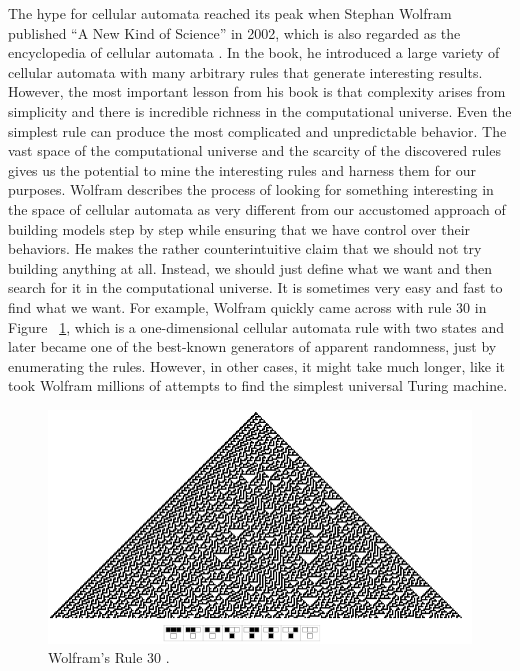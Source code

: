 \documentclass[12pt]{article}
\numberwithin{figure}{section} %
\begin{document}
The hype for cellular automata reached its peak when Stephan Wolfram published “A New Kind of Science” in 2002, which is also regarded as the encyclopedia of cellular automata \cite{A new kind of Science}. In the book, he introduced a large variety of cellular automata with many arbitrary rules that generate interesting results. However, the most important lesson from his book is that complexity arises from simplicity and there is incredible richness in the computational universe. Even the simplest rule can produce the most complicated and unpredictable behavior. The vast space of the computational universe and the scarcity of the discovered rules gives us the potential to mine the interesting rules and harness them for our purposes. Wolfram describes the process of looking for something interesting in the space of cellular automata as very different from our accustomed approach of building models step by step while ensuring that we have control over their behaviors. He makes the rather counterintuitive claim that we should not try building anything at all. Instead, we should just define what we want and then search for it in the computational universe. It is sometimes very easy and fast to find what we want. For example, Wolfram quickly came across with rule 30 \cite{Rule 30} in Figure ~\ref{fig:Rule 30}, which is a one-dimensional cellular automata rule with two states and later became one of the best-known generators of apparent randomness, just by enumerating the rules. However, in other cases, it might take much longer, like it took Wolfram millions of attempts to find the simplest universal Turing machine. 
 
\begin{figure}[H]
	\includegraphics[width=\linewidth]{Section2/1}
	\caption[Wolfram's Rule 30]{Wolfram’s Rule 30 \cite{Rule 30}.}
	\vspace{-1.5em}
	\label{fig:Rule 30}
\end{figure}
\end{document}
